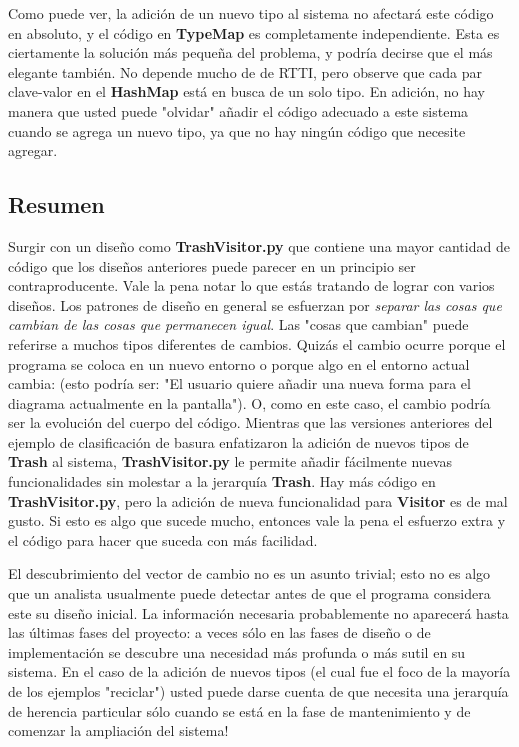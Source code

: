 \documentclass{article}
\begin{document}
Como puede ver, la adición de un nuevo tipo al sistema no afectará este código en absoluto, y el código en \textbf{TypeMap} es completamente independiente. Esta es ciertamente la solución más pequeña del problema, y podría decirse que el más elegante también. No depende mucho de de RTTI, pero observe que cada par clave-valor en el \textbf{HashMap} está en busca de un solo tipo. En adición, no hay manera que usted puede "olvidar" añadir el código adecuado a este sistema cuando se agrega un nuevo tipo, ya que no hay ningún código que necesite agregar.       \newline

\subsection{Resumen}

Surgir %
con un diseño como \textbf{TrashVisitor.py} que contiene una mayor cantidad de código que los diseños anteriores puede parecer en un principio ser contraproducente. Vale la pena notar lo que estás tratando de lograr con varios diseños. Los patrones de diseño en general se esfuerzan por \textit{separar las cosas que cambian de las cosas que permanecen igual}. Las "cosas que cambian" puede referirse a muchos tipos diferentes de cambios. Quizás el cambio ocurre porque el programa se coloca en un nuevo entorno o porque algo en el entorno actual cambia: (esto podría ser: "El usuario quiere añadir una nueva forma para el diagrama actualmente en la pantalla"). O, como en este caso, el cambio podría ser la evolución del cuerpo del código. Mientras que las versiones anteriores del ejemplo de clasificación de basura enfatizaron la adición de nuevos tipos de \textbf{Trash} al sistema, \textbf{TrashVisitor.py} le permite añadir fácilmente nuevas funcionalidades sin molestar a la jerarquía \textbf{Trash}. Hay más código en \textbf{TrashVisitor.py}, pero la adición de nueva funcionalidad para \textbf{Visitor} es de mal gusto. Si esto es algo que sucede mucho, entonces vale la pena el esfuerzo extra y el código para hacer que suceda con más facilidad.\newline

El descubrimiento del vector de cambio no es un asunto trivial; esto no es algo que un analista usualmente puede detectar antes de que el programa considera este su diseño inicial. La información necesaria probablemente no aparecerá hasta las últimas fases del proyecto: a veces sólo en las fases de diseño o de implementación se descubre una necesidad más profunda o más sutil en su sistema. En el caso de la adición de nuevos tipos (el cual fue el foco de la mayoría de los ejemplos "reciclar") usted puede darse cuenta de que necesita una jerarquía de herencia particular sólo cuando se está en la fase de mantenimiento y de comenzar la ampliación del sistema! \newline
\end{document}
